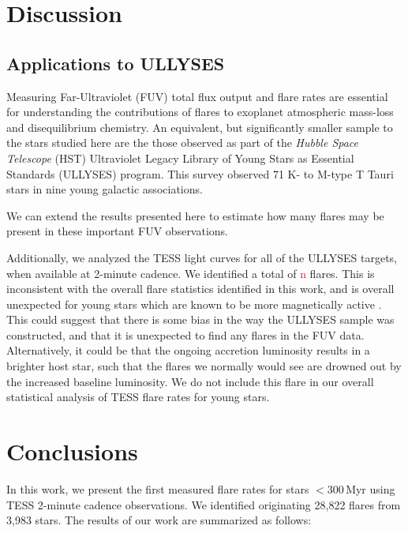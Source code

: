 \documentclass[twocolumn]{aastex631}
\begin{document}
\section{Discussion}\label{sec:discuss}

\subsection{Applications to ULLYSES}

Measuring Far-Ultraviolet (FUV) total flux output and flare rates are
essential for understanding the contributions of flares to exoplanet atmospheric
mass-loss and disequilibrium chemistry. An equivalent, but significantly smaller sample
to the stars studied here are the those observed as part of the \textit{Hubble Space Telescope}
(HST) Ultraviolet Legacy Library of Young Stars as Essential Standards (ULLYSES)
program. This survey observed 71 K- to M-type T Tauri stars in nine young
galactic associations.

We can extend the results presented here to estimate how many flares may be present
in these important FUV observations.

Additionally, we analyzed the TESS light curves for all of the ULLYSES targets, when
available at 2-minute cadence. We identified a total of \textcolor{red}{n} flares.
This is inconsistent with the overall flare statistics identified in this work, and is
overall unexpected for young stars which are known to be more magnetically active
\citep{ilin20, feinstein20b}. This could suggest that there is some bias in the way
the ULLYSES sample was constructed, and that it is unexpected to find any flares in the
FUV data. Alternatively, it could be that the ongoing accretion luminosity results
in a brighter host star, such that the flares we normally would see are drowned
out by the increased baseline luminosity. We do not include this flare in our
overall statistical analysis of TESS flare rates for young stars.


\section{Conclusions}\label{sec:conclusions}

In this work, we present the first measured flare rates for stars $< 300$\,Myr using
TESS 2-minute cadence observations. We identified originating 28,822 flares from
3,983 stars. The results of our work are summarized as follows:
\end{document}

